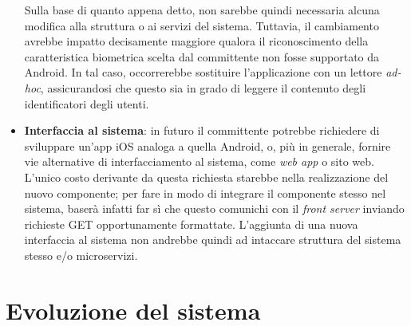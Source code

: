 \documentclass[a4paper,12pt]{report}
\begin{document}
\begin{itemize}
	Sulla base di quanto appena detto, non sarebbe quindi necessaria alcuna modifica alla struttura o ai servizi del sistema. Tuttavia, il cambiamento avrebbe impatto decisamente maggiore qualora il riconoscimento della caratteristica biometrica scelta dal committente non fosse supportato da Android. In tal caso, occorrerebbe sostituire l'applicazione con un lettore \emph{ad-hoc}, assicurandosi che questo sia in grado di leggere il contenuto degli identificatori degli utenti.
	
	\item \textbf{Interfaccia al sistema}: in futuro il committente potrebbe richiedere di sviluppare un'app iOS analoga a quella Android, o, più in generale, fornire vie alternative di interfacciamento al sistema, come \emph{web app} o sito web. L'unico costo derivante da questa richiesta starebbe nella realizzazione del nuovo componente; per fare in modo di integrare il componente stesso nel sistema, baserà infatti far sì che questo comunichi con il \emph{front server} inviando richieste GET opportunamente formattate. L'aggiunta di una nuova interfaccia al sistema non andrebbe quindi ad intaccare struttura del sistema stesso e/o microservizi.
\end{itemize}

\section{Evoluzione del sistema}
\end{document}
